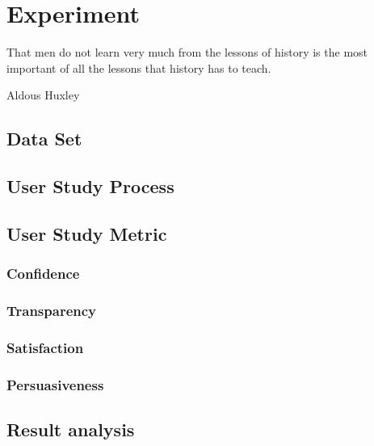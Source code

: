 
\section{Experiment}
\label{ch:experiment}

\epigraph{That men do not learn very much from the lessons of history is the most important of all the lessons that history has to teach.}{Aldous Huxley}

\subsection{Data Set}

\subsection{User Study Process}

\subsection{User Study Metric}
	\subsubsection{Confidence}
	\subsubsection{Transparency}
	\subsubsection{Satisfaction}
	\subsubsection{Persuasiveness}
	
\subsection{Result analysis}

\cleardoublepage